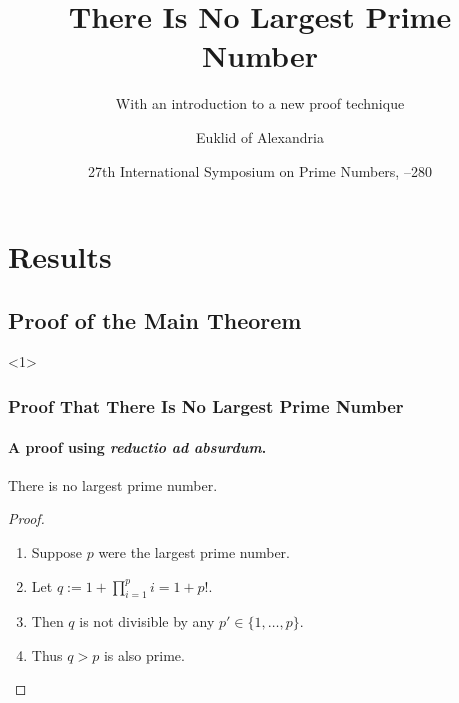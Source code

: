 %

\beamertemplatetransparentcovered

\usepackage{times}

\title{There Is No Largest Prime Number}
\subtitle{With an introduction to a new proof technique}

\author{Euklid of Alexandria}
\date{27th International Symposium on Prime Numbers, --280}



\begin{frame}
  \titlepage
  \tableofcontents
\end{frame}

\section{Results}
\subsection{Proof of the Main Theorem}

\begin{frame}<1>
  \frametitle{Proof That There Is No Largest Prime Number}
  \framesubtitle{A proof using \textit{reductio ad absurdum}.}

  \begin{theorem}
    There is no largest prime number.
  \end{theorem}
  \begin{proof}
    \begin{enumerate}
    \item<1-> Suppose $p$ were the largest prime number.
    \item<2-> Let $q := 1 + \prod_{i=1}^p i = 1+p!$.
    \item<3-> Then $q$ is not divisible by any $p' \in \{1,\dots,p\}$.
    \item<1-> Thus $q>p$ is also prime.\qedhere
    \end{enumerate}      
  \end{proof}
\end{frame}




